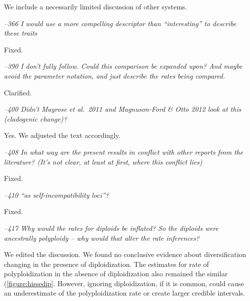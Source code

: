 \documentclass[11pt]{article}
\renewenvironment{quote}{\bigskip\noindent\itshape\ignorespaces}{\smallskip}
\begin{document}
We include a necessarily limited discussion of other systems.


\begin{quote}
--366  I would use a more compelling descriptor than ``interesting'' to describe these traits
\end{quote}

Fixed.


\begin{quote}
--390  I don't fully follow.
Could this comparison be expanded upon?
And maybe avoid the parameter notation, and just describe the rates being compared.
\end{quote}

Clarified.


\begin{quote}
--400  Didn't Mayrose et al.\ 2011 and Magnuson-Ford \& Otto 2012 look at this (cladogenic change)?
\end{quote}

Yes. We adjusted the text accordingly.


\begin{quote}
--408  In what way are the present results in conflict with other reports from the literature?
(It's not clear, at least at first, where this conflict lies)
\end{quote}

Fixed.


\begin{quote}
--410  ``as self-incompatibility loci''?
\end{quote}

Fixed.

\begin{quote}
--417  Why would the rates for diploids be inflated?
So the diploids were ancestrally polyploidy -- why would that alter the rate inferences?
\end{quote}

We edited the discussion. 
We found no conclusive evidence about diversification changing in the presence of diploidization. 
The estimates for rate of polyploidization in the absence of diploidization also remained the similar (\cref{figure:hissedip}. 
However, ignoring diploidization, if it is common, could cause an underestimate of the polyploidization rate or create larger credible intervals.
\end{document}
